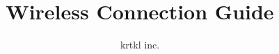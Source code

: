 
%
%
\title{Wireless Connection Guide}
\author{krtkl inc.}

\makeatletter




	\maketitle

	
	
	

	
	
	

	
	
	
	

	
	

		


